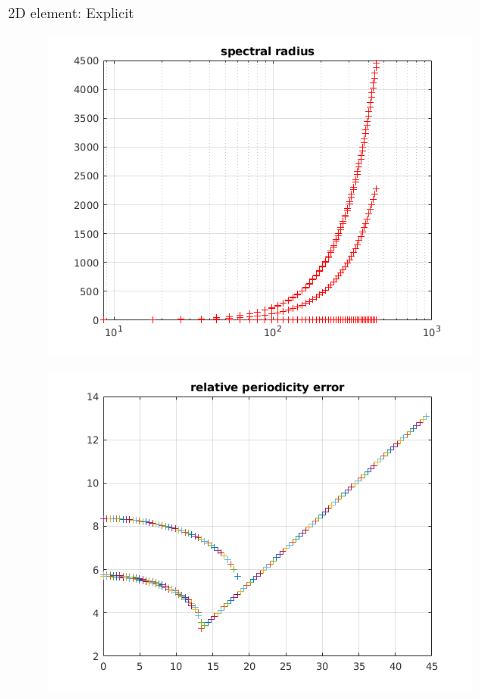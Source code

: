 \begin{frame}{2D element: Explicit}
\begin{figure}[ht]
\begin{minipage}[b]{0.5\linewidth}
  \end{minipage}%
  \begin{minipage}[b]{0.5\linewidth}
    \centering
    \includegraphics[scale=.35]{images/2D-exp-2.png} \\
  \end{minipage} 
  \begin{minipage}[b]{0.5\linewidth}
    \centering
    \includegraphics[scale=.35]{images/2D-exp-3.png} \\
  \end{minipage}%
  \begin{minipage}[b]{0.5\linewidth}
    \centering

\end{minipage}
\end{figure}
\end{frame}
